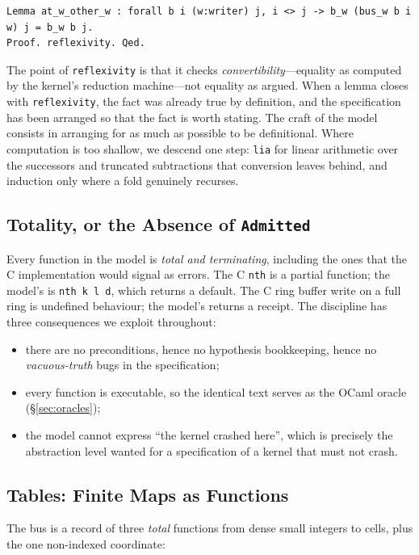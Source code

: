 \documentclass[10pt,journal,compsoc,twocolumn]{article}
\theoremstyle{definition}
\theoremstyle{remark}
\theoremstyle{plain}
\newcommand{\ctr}[1]{\texttt{#1}}
\begin{document}
\begin{lstlisting}[language=Coq,caption={A frame lemma: writing one writer leaves the other writers untouched.}]
Lemma at_w_other_w : forall b i (w:writer) j, i <> j -> b_w (bus_w b i w) j = b_w b j.
Proof. reflexivity. Qed.
\end{lstlisting}

The point of \lstinline|reflexivity| is that it checks \emph{convertibility}---equality as computed by the kernel's reduction machine---not equality as argued. When a lemma closes with \ctr{reflexivity}, the fact was already true by definition, and the specification has been arranged so that the fact is worth stating. The craft of the model consists in arranging for as much as possible to be definitional. Where computation is too shallow, we descend one step: \ctr{lia} for linear arithmetic over the successors and truncated subtractions that conversion leaves behind, and induction only where a fold genuinely recurses.

\subsection{Totality, or the Absence of \ctr{Admitted}}
Every function in the model is \emph{total and terminating}, including the ones that the C implementation would signal as errors. The C \ctr{nth} is a partial function; the model's is \ctr{nth k l d}, which returns a default. The C ring buffer write on a full ring is undefined behaviour; the model's returns a receipt. The discipline has three consequences we exploit throughout:
\begin{itemize}[leftmargin=*]
    \item there are no preconditions, hence no hypothesis bookkeeping, hence no \emph{vacuous-truth} bugs in the specification;
    \item every function is executable, so the identical text serves as the OCaml oracle (\S\ref{sec:oracles});
    \item the model cannot express ``the kernel crashed here'', which is precisely the abstraction level wanted for a specification of a kernel that must not crash.
\end{itemize}

\subsection{Tables: Finite Maps as Functions}
\label{sec:tables}
The bus is a record of three \emph{total} functions from dense small integers to cells, plus the one non-indexed coordinate:
\end{document}
